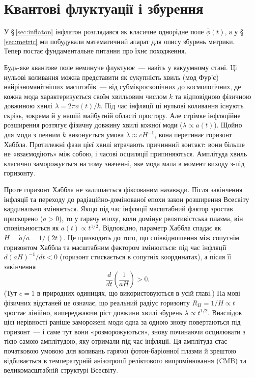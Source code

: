 
\chapter{Квантові флуктуації і збурення}
\label{sec:quantum}

У §\,\ref{sec:inflaton} інфлатон розглядався як класичне однорідне
поле $\bar{\phi}(t)$, а у §\,\ref{sec:metric} ми побудували математичний апарат
для опису збурень метрики. Тепер постає фундаментальне питання про
їхнє походження.

Будь-яке квантове поле неминуче флуктуює~--- навіть у вакуумному стані.
Ці нульові коливання можна представити як сукупність хвиль (мод Фур'є)
найрізноманітніших масштабів~--- від субмікроскопічних до космологічних,
де кожна мода характеризується своїм хвильовим числом $k$ та відповідною
фізичною довжиною хвилі $\lambda = 2\pi a(t)/k$. Під час інфляції ці
нульові коливання існують скрізь, зокрема й у нашій майбутній області простору.
Але стрімке інфляційне розширення розтягує фізичну довжину хвилі кожної моди
($\lambda \propto a(t)$). Щойно для моди з певним $k$ виконується умова
$\lambda \approx cH^{-1}$, вона перетинає горизонт Хаббла. Протилежні фази
цієї хвилі втрачають причинний контакт: вони більше не «взаємодіють» між
собою, і часові осциляції припиняються. Амплітуда хвиль класично
заморожується на тому значенні, яке мода мала в момент виходу з-під горизонту.

Проте горизонт Хаббла не залишається фіксованим назавжди. Після закінчення
інфляції та переходу до радіаційно-домінованої епохи закон розширення Всесвіту
кардинально змінюється. Якщо під час інфляції масштабний фактор зростав
прискорено ($\ddot{a} > 0$), то у гарячу епоху, коли домінує релятивістська
плазма, він сповільнюється як $a(t) \propto t^{1/2}$. Відповідно, параметр
Хаббла спадає як $H = \dot{a}/a = 1/(2t)$. Це призводить до того, що
співвідношення між сопутнім горизонтом Хаббла та масштабним фактором
змінюється: під час інфляції $d(aH)^{-1}/dt < 0$ (горизонт стискається
в сопутніх координатах), а після її закінчення
\begin{equation}
\frac{d}{dt}\left( \frac{1}{aH} \right) > 0.
\label{eq:horizon_growth}
\end{equation}
(Тут $c=1$ в природних одиницях, що використовуються в усій главі.)
На мові фізичних відстаней це означає, що реальний радіус горизонту
$R_H = 1/H \propto t$ зростає лінійно, випереджаючи ріст довжини хвилі
збурень $\lambda \propto t^{1/2}$. Внаслідок цієї нерівності раніше
заморожені моди одна за одною знову повертаються під горизонт~--- і саме тут
вони «розморожуються», знову починаючи осцилювати з тією самою амплітудою,
яку отримали під час інфляції. Ця амплітуда стає початковою умовою для
коливань гарячої фотон-баріонної плазми й зрештою відбивається в температурній
анізотропії реліктового випромінювання (CMB) та великомасштабній структурі Всесвіту.

